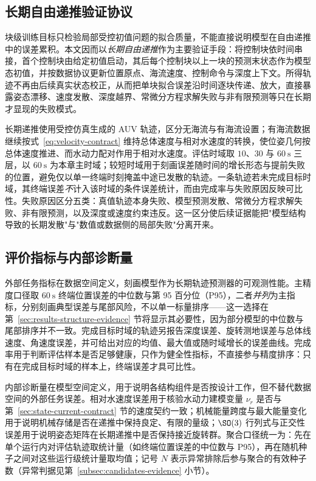 \subsection{长期自由递推验证协议}
\label{subsec:rollout-protocol}

块级训练目标只检验局部受控初值问题的拟合质量，不能直接说明模型在自由递推中的误差累积。本文因而以\emph{长期自由递推}作为主要验证手段：将控制块依时间串接，首个控制块由给定初值启动，其后每个控制块以上一块的预测末状态作为模型态初值，并按数据协议更新位置原点、海流速度、控制命令与深度上下文。所得轨迹不再由后续真实状态校正，从而把单块拟合误差沿时间逐块传递、放大，直接暴露姿态漂移、速度发散、深度越界、常微分方程求解失败与非有限预测等只在长期才显现的失败模式。

长期递推使用受控仿真生成的 AUV 轨迹，区分无海流与有海流设置；有海流数据继续按式~\eqref{eq:velocity-contract} 维持总体速度与相对水速度的转换，使位姿几何按总体速度推进、而水动力配对作用于相对水速度。评估时域取 \(10\)、\(30\) 与 \(60~\mathrm{s}\) 三层，以 \(60~\mathrm{s}\) 为本章主时域；较短时域用于刻画误差随时间的增长形态与提前失败的位置，避免仅以单一终端时刻掩盖中途已发散的轨迹。一条轨迹若未完成目标时域，其终端误差\emph{不}计入该时域的条件误差统计，而由完成率与失败原因反映可比性。失败原因区分五类：真值轨迹本身失败、模型预测发散、常微分方程求解失败、非有限预测，以及深度或速度约束违反。这一区分使后续证据能把"模型结构导致的长期发散"与"数值或数据侧的局部失败"分离开来。

\subsection{评价指标与内部诊断量}
\label{subsec:metrics}

外部任务指标在数据空间定义，刻画模型作为长期轨迹预测器的可观测性能。主精度口径取 \(60~\mathrm{s}\) 终端位置误差的中位数与第 95 百分位（P95），二者\emph{并列}为主指标，分别刻画典型误差与尾部风险，不以单一标量排序——这一选择在第~\ref{sec:results-structure-evidence} 节将显示其必要性，因为部分模型的中位数与尾部排序并不一致。完成目标时域的轨迹另报告深度误差、旋转测地误差与总体线速度、角速度误差，并可给出对应的均值、最大值或随时域增长的误差曲线。完成率用于判断评估样本是否足够健康，只作为健全性指标，不直接参与精度排序：只有在完成目标时域的样本上，终端误差才具可比性。

内部诊断量在模型空间定义，用于说明各结构组件是否按设计工作，但不替代数据空间的外部任务误差。相对水速度误差用于核验水动力建模变量 \(\nu_r\) 是否与第~\ref{sec:state-current-contract} 节的速度契约一致；机械能量跨度与最大能量变化用于说明机械存储是否在递推中保持良定、有限的量级；\(\SO(3)\) 行列式与正交性误差用于说明姿态矩阵在长期递推中是否保持接近旋转群。聚合口径统一为：先在单个运行内对评估轨迹取统计量（如终端位置误差的中位数与 P95），再在随机种子之间对这些运行级统计量取均值；记号 \(N\) 表示异常排除后参与聚合的有效种子数（异常判据见第~\ref{subsec:candidates-evidence} 小节）。


